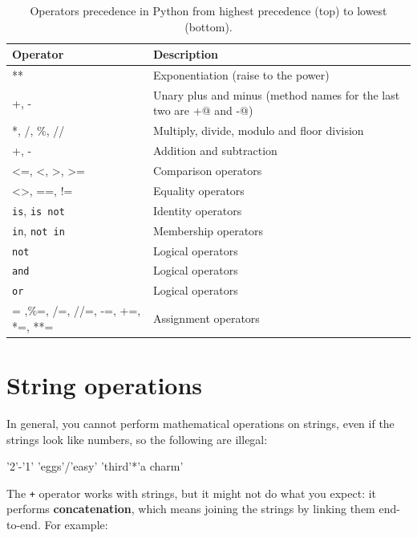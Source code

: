 \begin{table}[htb]
\begin{center}
\begin{tabular}{|p{3cm}|p{7cm}|}
\hline
Operator & Description\\\hline
** & Exponentiation (raise to the power)\\
+, - & Unary plus and minus (method names for the last two are +@ and -@)\\
*, /, \%, //  & Multiply, divide, modulo and floor division\\
+, - & Addition and subtraction\\
<=, <, >, >= & Comparison operators\\
<>, ==, != & Equality operators\\
\verb|is|, \verb|is not| & Identity operators\\
\verb|in|, \verb|not in| & Membership operators\\
\verb|not| & Logical operators\\
\verb|and| & Logical operators\\
\verb|or|  & Logical operators\\
= ,\%=, /=, //=, -=, +=, *=, **= & Assignment operators\\\hline
\end{tabular}
\caption{Operators precedence in Python from highest precedence (top) to lowest (bottom).}
\label{tab:operator_precedence}
\end{center}
\end{table}

\section{String operations}

In general, you cannot perform mathematical operations on strings, even
if the strings look like numbers, so the following are illegal:

\beforeverb
\begin{pyinterpreter}
'2'-'1'    'eggs'/'easy'    'third'*'a charm'
\end{pyinterpreter}
\afterverb
%
The {\tt +} operator works with strings, but it
might not do what you expect: it performs
{\bf concatenation}, which means joining the strings by
linking them end-to-end.  For example:

